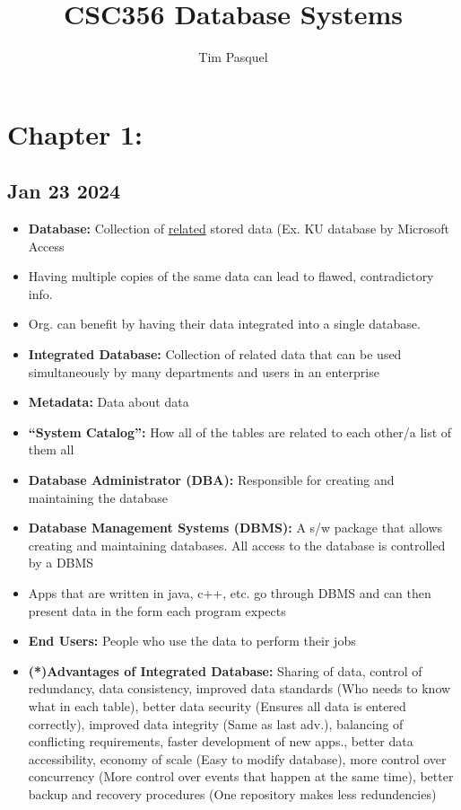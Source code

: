 \documentclass[12pt]{article}
\author{Tim Pasquel}
\title{CSC356 Database Systems}
\begin{document}
\maketitle

\titlepage

\section{Chapter 1:}

\subsection*{Jan 23 2024}

\begin{itemize}
		  \item \textbf{Database:} Collection of \underline{related} stored data (Ex. KU database by Microsoft Access
		  \item Having multiple copies of the same data can lead to flawed, contradictory info. 
		  \item Org. can benefit by having their data integrated into a single database.
		  \item \textbf{Integrated Database:} Collection of related data that can be used simultaneously by many departments and users in an enterprise
		  \item \textbf{Metadata:} Data about data
		  \item \textbf{``System Catalog'':} How all of the tables are related to each other/a list of them all
		  \item \textbf{Database Administrator (DBA):} Responsible for creating and maintaining the database
		  \item \textbf{Database Management Systems (DBMS):} A s/w package that allows creating and maintaining databases. All access to the database is controlled by a DBMS
		  \item Apps that are written in java, c++, etc. go through DBMS and can then present data in the 
					 form each program expects 
		  \item \textbf{End Users:} People who use the data to perform their jobs
		  \item \textbf{(*)Advantages of Integrated Database:} Sharing of data, control of redundancy, data consistency, improved data standards (Who needs to know what in each table), better data security (Ensures all data is entered correctly), improved data integrity (Same as last adv.), balancing of conflicting requirements, faster development of new apps., better data accessibility, economy of scale (Easy to modify database), more control over concurrency (More control over events that happen at the same time), better backup and recovery procedures (One repository makes less redundencies)
\end{itemize}
\end{document}
